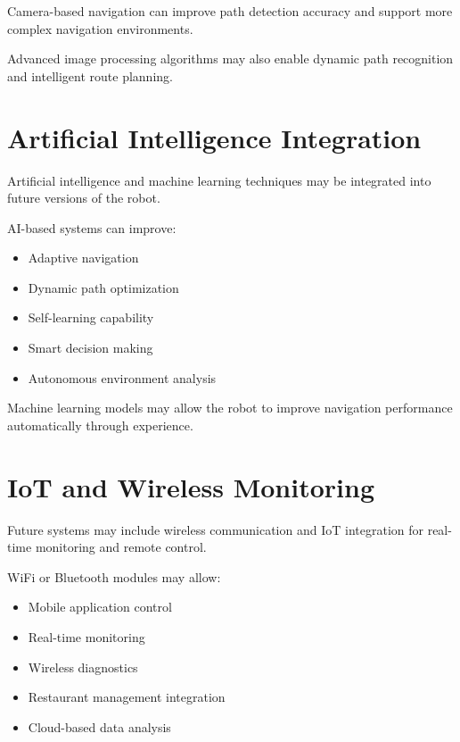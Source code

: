 \documentclass[12pt,a4paper,oneside]{report}
\begin{document}
Camera-based navigation can improve path detection accuracy and support more complex navigation environments.

Advanced image processing algorithms may also enable dynamic path recognition and intelligent route planning.


\section{Artificial Intelligence Integration}

Artificial intelligence and machine learning techniques may be integrated into future versions of the robot.

AI-based systems can improve:

\begin{itemize}

\item Adaptive navigation

\item Dynamic path optimization

\item Self-learning capability

\item Smart decision making

\item Autonomous environment analysis

\end{itemize}

Machine learning models may allow the robot to improve navigation performance automatically through experience.


\section{IoT and Wireless Monitoring}

Future systems may include wireless communication and IoT integration for real-time monitoring and remote control.

WiFi or Bluetooth modules may allow:

\begin{itemize}

\item Mobile application control

\item Real-time monitoring

\item Wireless diagnostics

\item Restaurant management integration

\item Cloud-based data analysis

\end{itemize}
\end{document}
